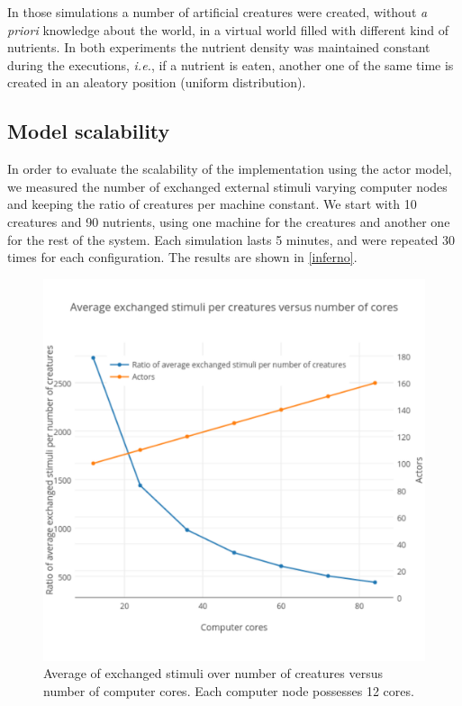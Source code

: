 \documentclass{aamas2017}
\begin{document}
In those simulations a number of artificial creatures were created, without \textit{a priori} knowledge about the world, in a virtual world filled with different kind of nutrients. In both experiments the nutrient density was maintained constant during the executions, \textit{i.e.},  if a nutrient is eaten, another one of the same time is created in an aleatory position (uniform distribution). 

\subsection{Model scalability}

In order to evaluate the scalability of the implementation using the actor model, we measured the number of exchanged external stimuli varying computer nodes and keeping the ratio of creatures per machine constant. We start with 10 creatures and 90 nutrients, using one machine for the creatures and another one for the rest of the system. Each simulation lasts 5 minutes, and were repeated 30 times for each configuration. The results are shown in \autoref{inferno}.

\begin{figure}[H]
	\centering
	\includegraphics[scale=0.4]{images/ratioCreature}
	\caption{Average of exchanged stimuli over number of creatures versus number of computer cores. Each computer node possesses 12 cores.}
	\label{inferno}
\end{figure}
\end{document}

